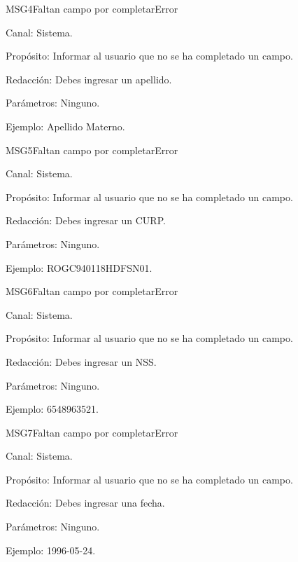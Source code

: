 
\begin{mensaje}{MSG4}{Faltan campo por completar}{Error}
	\item[Canal:] Sistema.
	\item[Propósito:] Informar al usuario que no se ha completado un campo.
	\item[Redacción:] Debes ingresar un apellido.
	\item[Parámetros:] Ninguno.
	\item[Ejemplo:] Apellido Materno.
\end{mensaje}
\newline



\begin{mensaje}{MSG5}{Faltan campo por completar}{Error}
	\item[Canal:] Sistema.
	\item[Propósito:] Informar al usuario que no se ha completado un campo.
	\item[Redacción:] Debes ingresar un CURP.
	\item[Parámetros:] Ninguno.
	\item[Ejemplo:] ROGC940118HDFSN01.
\end{mensaje}
\newline



\begin{mensaje}{MSG6}{Faltan campo por completar}{Error}
	\item[Canal:] Sistema.
	\item[Propósito:] Informar al usuario que no se ha completado un campo.
	\item[Redacción:] Debes ingresar un NSS.
	\item[Parámetros:] Ninguno.
	\item[Ejemplo:] 6548963521.
\end{mensaje}
\newline



\begin{mensaje}{MSG7}{Faltan campo por completar}{Error}
	\item[Canal:] Sistema.
	\item[Propósito:] Informar al usuario que no se ha completado un campo.
	\item[Redacción:] Debes ingresar una fecha.
	\item[Parámetros:] Ninguno.
	\item[Ejemplo:] 1996-05-24.
\end{mensaje}
\newline


